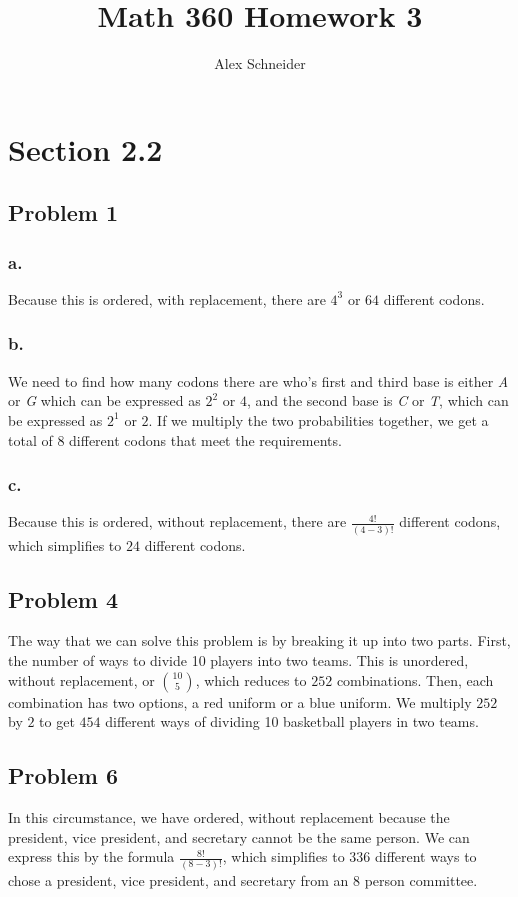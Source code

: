 \documentclass[11pt]{article}
\title{Math 360 Homework 3}
\author{Alex Schneider}
\begin{document}
\maketitle
\section*{Section 2.2}
\subsection*{Problem 1}
\subsubsection*{a.}
Because this is ordered, with replacement, there are $4^3$ or $64$ different codons. 

\subsubsection*{b.}
We need to find how many codons there are who's first and third base is either
\textit{A} or \textit{G} which can be expressed as $2^2$ or $4$, and the second base is 
\textit{C} or \textit{T}, which can be expressed as $2^1$ or $2$. If we multiply
the two probabilities together, we get a total of $8$ different codons that meet
the requirements.

\subsubsection*{c.}
Because this is ordered, without replacement, there are $\frac{4!}{(4-3)!}$
different codons, which simplifies to $24$ different codons. 

\subsection*{Problem 4}
The way that we can solve this problem is by breaking it up into two parts.
First, the number of ways to divide 10 players into two teams. This is
unordered, without replacement, or $10 \choose 5$, which reduces to $252$
combinations. Then, each combination has two options, a red uniform or a blue
uniform. We multiply $252$ by $2$ to get $454$ different ways of dividing 10
basketball players in two teams. 

\subsection*{Problem 6}
In this circumstance, we have ordered, without replacement because the
president, vice president, and secretary cannot be the same person. We 
can express this by the formula $\frac{8!}{(8-3)!}$, which simplifies to $336$
different ways to chose a president, vice president, and secretary from an 8
person committee. 
\end{document}

